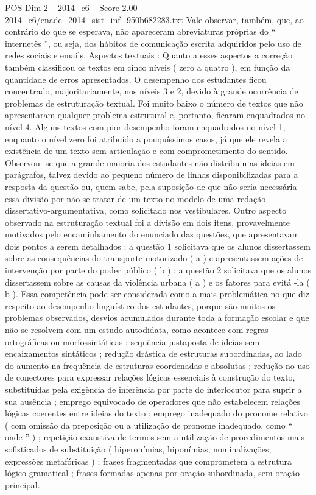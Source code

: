 \begin{textsample}{POS Dim 2 – 2014\_c6 – Score 2.00 – 2014\_c6/enade\_2014\_sist\_inf\_950b682283.txt}
Vale observar, também, que, ao contrário do que se esperava, não apareceram abreviaturas próprias do “ internetês ”, ou seja, dos hábitos de comunicação escrita adquiridos pelo uso de redes sociais e emails.
Aspectos textuais : Quanto a esses aspectos a correção também classificou os textos em cinco níveis ( zero a quatro ), em função da quantidade de erros apresentados.
O desempenho dos estudantes ficou concentrado, majoritariamente, nos níveis 3 e 2, devido à grande ocorrência de problemas de estruturação textual.
Foi muito baixo o número de textos que não apresentaram qualquer problema estrutural e, portanto, ficaram enquadrados no nível 4.
Alguns textos com pior desempenho foram enquadrados no nível 1, enquanto o nível zero foi atribuído a pouquíssimos casos, já que ele revela a existência de um texto sem articulação e com comprometimento do sentido.
Observou -se que a grande maioria dos estudantes não distribuiu as ideias em parágrafos, talvez devido ao pequeno número de linhas disponibilizadas para a resposta da questão ou, quem sabe, pela suposição de que não seria necessária essa divisão por não se tratar de um texto no modelo de uma redação dissertativo-argumentativa, como solicitado nos vestibulares.
Outro aspecto observado na estruturação textual foi a divisão em dois itens, provavelmente motivados pelo encaminhamento do enunciado das questões, que apresentavam dois pontos a serem detalhados : a questão 1 solicitava que os alunos dissertassem sobre as consequências do transporte motorizado ( a ) e apresentassem ações de intervenção por parte do poder público ( b ) ; a questão 2 solicitava que os alunos dissertassem sobre as causas da violência urbana ( a ) e os fatores para evitá -la ( b ).
Essa competência pode ser considerada como a mais problemática no que diz respeito ao desempenho linguístico dos estudantes, porque são muitos os problemas observados, desvios acumulados durante toda a formação escolar e que não se resolvem com um estudo autodidata, como acontece com regras ortográficas ou morfossintáticas : sequência justaposta de ideias sem encaixamentos sintáticos ; redução drástica de estruturas subordinadas, ao lado do aumento na frequência de estruturas coordenadas e absolutas ; redução no uso de conectores para expressar relações lógicas essenciais à construção do texto, substituídas pela exigência de inferência por parte do interlocutor para suprir a sua ausência ; emprego equivocado de operadores que não estabelecem relações lógicas coerentes entre ideias do texto ; emprego inadequado do pronome relativo ( com omissão da preposição ou a utilização de pronome inadequado, como “ onde ” ) ; repetição exaustiva de termos sem a utilização de procedimentos mais sofisticados de substituição ( hiperonímias, hiponímias, nominalizações, expressões metafóricas ) ; frases fragmentadas que comprometem a estrutura lógico-gramatical ; frases formadas apenas por oração subordinada, sem oração principal.

\end{textsample}
